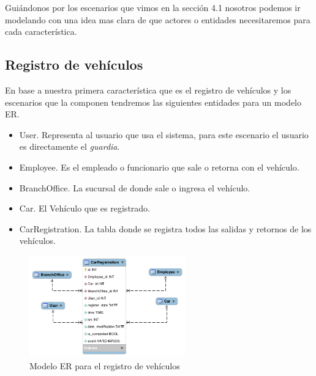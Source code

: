 Guiándonos por los escenarios que vimos en la sección 4.1 nosotros podemos ir
modelando con una idea mas clara de que actores o entidades necesitaremos para
cada característica.

\subsection{Registro de vehículos}
En base a nuestra primera característica que es el registro de vehículos y los
escenarios que la componen tendremos las siguientes entidades para un modelo ER.

%    

\begin{itemize}
    \item User. Representa al usuario que usa el sistema, para este escenario el
      usuario es directamente el {\it guardia}.
    \item Employee. Es el empleado o funcionario que sale o retorna con el vehículo.
    \item BranchOffice. La sucursal de donde sale o ingresa el vehículo.
    \item Car. El Vehículo que es registrado.
    \item CarRegistration. La tabla donde se registra todos las salidas y retornos
        de los vehículos.
\end{itemize}

\begin{figure}[h]
  \begin{center}
    \includegraphics[width=0.6\textwidth]{figures/chapter4/er_registro.png}
    \caption[Modelo ER - Registro de vehículos]{Modelo ER para el registro de vehículos}
  \end{center}
\end{figure}

